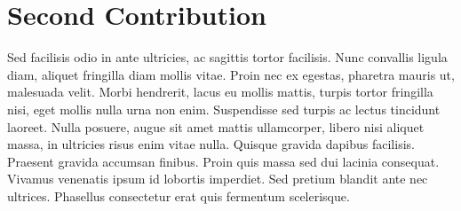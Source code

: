 \chapter{Second Contribution\label{chap:Contribution2}}

Sed facilisis odio in ante ultricies, ac sagittis tortor facilisis. Nunc convallis ligula diam, aliquet fringilla diam mollis vitae. Proin nec ex egestas, pharetra mauris ut, malesuada velit. Morbi hendrerit, lacus eu mollis mattis, turpis tortor fringilla nisi, eget mollis nulla urna non enim. Suspendisse sed turpis ac lectus tincidunt laoreet. Nulla posuere, augue sit amet mattis ullamcorper, libero nisi aliquet massa, in ultricies risus enim vitae nulla. Quisque gravida dapibus facilisis. Praesent gravida accumsan finibus. Proin quis massa sed dui lacinia consequat. Vivamus venenatis ipsum id lobortis imperdiet. Sed pretium blandit ante nec ultrices. Phasellus consectetur erat quis fermentum scelerisque.